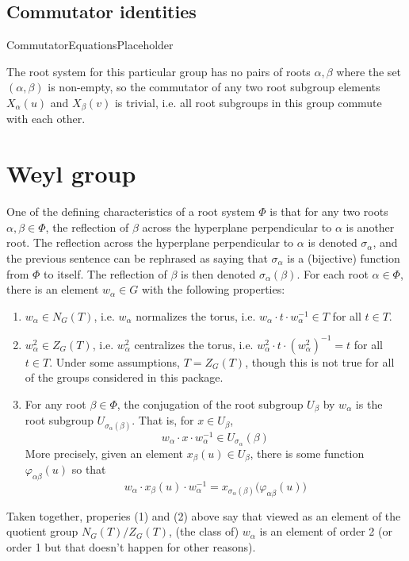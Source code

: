 \documentclass[11pt]{article}
\newcommand{\noi}{\noindent}
\newcommand{\inv}{^{-1}}
\newcommand{\sig}{\sigma}
\theoremstyle{definition}
\begin{document}
\bigskip

\def\arraystretch{1.2}
\noi 
\def\arraystretch{1}

\subsection{Commutator identities}

CommutatorEquationsPlaceholder

\else
The root system for this particular group has no pairs of roots $\alpha, \beta$ where the set $(\alpha, \beta)$ is non-empty, so the commutator of any two root subgroup elements $X_\alpha(u)$ and $X_\beta(v)$ is trivial, i.e. all root subgroups in this group commute with each other.
\fi

\newpage
\section{Weyl group}

One of the defining characteristics of a root system $\Phi$ is that for any two roots $\alpha, \beta \in \Phi$, the reflection of $\beta$ across the hyperplane perpendicular to $\alpha$ is another root. The reflection across the hyperplane perpendicular to $\alpha$ is denoted $\sig_\alpha$, and the previous sentence can be rephrased as saying that $\sig_\alpha$ is a (bijective) function from $\Phi$ to itself. The reflection of $\beta$ is then denoted $\sig_\alpha(\beta)$. For each root $\alpha \in \Phi$, there is an element $w_\alpha \in G$ with the following properties:
\begin{enumerate}
	\item $w_\alpha \in N_G(T)$, i.e. $w_\alpha$ normalizes the torus, i.e. $w_\alpha \cdot t \cdot w_\alpha \inv \in T$ for all $t \in T$.
	\item $w_\alpha^2 \in Z_G(T)$, i.e. $w_\alpha^2$ centralizes the torus, i.e. $w_\alpha^2 \cdot t \cdot (w_\alpha^2) \inv = t$ for all $t \in T$. Under some assumptions, $T = Z_G(T)$, though this is not true for all of the groups considered in this package.
	\item For any root $\beta \in \Phi$, the conjugation of the root subgroup $U_\beta$ by $w_\alpha$ is the root subgroup $U_{\sig_\alpha(\beta)}$. That is, for $x \in U_\beta$,
	\[
		w_\alpha \cdot x \cdot w_\alpha \inv \in U_{\sig_{\alpha}}(\beta)
	\]
	More precisely, given an element $x_\beta(u) \in U_\beta$, there is some function $\varphi_{\alpha \beta}(u)$ so that
	\[
		w_\alpha \cdot x_\beta(u) \cdot w_\alpha \inv = x_{\sig_{\alpha}(\beta)} \Big( \varphi_{\alpha \beta}(u) \Big)
	\]
\end{enumerate}
Taken together, properies (1) and (2) above say that viewed as an element of the quotient group $N_G(T)/Z_G(T)$, (the class of) $w_\alpha$ is an element of order 2 (or order 1 but that doesn't happen for other reasons).
\end{document}
